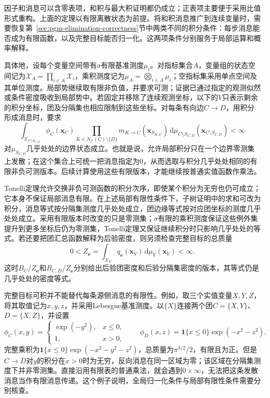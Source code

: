 因子和消息可以含零表项，和积与最大积证明都仍成立；正表项主要便于采用比值形式重构。上面的定理以有限离散状态为前提。将和积消息推广到连续变量时，需要恢复第~\ref{sec:pgm-elimination-correctness}节中两类不同的积分条件：每步消息能否成为有限函数，以及完整目标能否归一化。这两项条件分别服务于局部运算和概率解释。

具体地，设每个变量空间带有$\sigma$有限基准测度$\mu_i$。对指标集合$A$，变量组的状态空间记为$\mathcal X_A=\prod_{i\in A}\mathcal X_i$，乘积测度记为$\mu_A=\bigotimes_{i\in A}\mu_i$；空指标集采用单点空间及其单位测度。局部势继续取有限非负值，并要求可测；证据已通过指定的观测似然或条件密度吸收到局部势中。若固定并移除了连续观测坐标，以下的$V$只表示剩余的积分坐标，团及分隔集也相应限制到这些坐标。对每条有向边$C\to D$，用积分形成消息时，要求
\begin{equation}
  \int_{\mathcal X_{C\setminus S_{C,D}}}
    \phi_C(\bm{x}_C)
    \prod_{K\in N_{\mathcal T}(C)\setminus\{D\}}
      m_{K\to C}(\bm{x}_{S_{K,C}})
    \,\mathrm{d}\mu_{C\setminus S_{C,D}}
    (\bm{x}_{C\setminus S_{C,D}})<\infty
  \label{eq:pgm-junction-tree-local-integrability}
\end{equation}
对$\mu_{S_{C,D}}$几乎处处的边界状态成立。也就是说，允许局部积分只在一个边界零测集上发散；在这个集合上可统一把消息指定为$0$，从而选取与积分几乎处处相同的有限非负可测版本。后续计算使用这些有限版本，才能继续按普通实值函数作乘法。

Tonelli定理允许交换非负可测函数的积分次序，即使某个积分为无穷也仍可成立；它本身不保证局部消息有限。在上述局部有限性条件下，子树证明中的求和可改为积分，消息等式按分隔集测度几乎处处成立，团边缘等式按对应团坐标的测度几乎处处成立。采用有限版本时改变的只是零测集；$\sigma$有限的乘积测度保证这些例外集提升到更多坐标后仍为零测集，Tonelli定理又保证继续积分时只影响几乎处处的等式。若还要把团汇总函数解释为后验密度，则另须检查完整目标的总质量
\begin{equation}
  0<Z_{\bm e}
    =\int_{\mathcal X_V}q_{\bm e}(\bm{x}_V)
       \,\mathrm{d}\mu_V(\bm{x}_V)<\infty.
  \label{eq:pgm-junction-tree-continuous-normalizer}
\end{equation}
这时$B_C/Z_{\bm e}$和$B_{C,D}/Z_{\bm e}$分别给出后验团密度和后验分隔集密度的版本，其等式仍是几乎处处的密度等式。

完整目标可积并不能替代每条源侧消息的有限性。例如，取三个实值变量$X,Y,Z$，将其取值记为$x,y,z$，并采用Lebesgue基准测度。以$\{X\}$连接两个团$C=\{X,Y\}$、$D=\{X,Z\}$，并设置
\[
  \phi_C(x,y)=
    \begin{cases}
      \exp(-y^2),&x\le0,\\
      1,&x>0,
    \end{cases}
  \qquad
  \phi_D(x,z)=\mathbf1\{x\le0\}\exp(-x^2-z^2).
\]
完整乘积为$\mathbf1\{x\le0\}\exp(-x^2-y^2-z^2)$，总质量为$\pi^{3/2}/2$，有限且为正。但是$C\to D$对$y$的积分在$x>0$时为无穷，反向消息在同一区域为零；该区域在分隔集测度下并非零测集。直接沿用有限表的普通乘法，就会遇到$0\times\infty$，无法把这条发散消息当作有限消息传递。这个例子说明，全局归一化条件与局部有限性条件需要分别核查。

